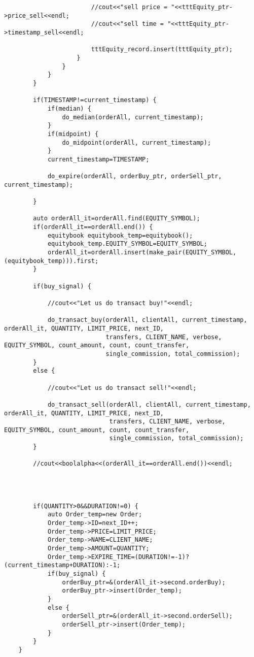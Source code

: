 \documentclass{article}
\begin{document}
\begin{spacing}{1.5}
\begin{lstlisting}
                        //cout<<"sell price = "<<tttEquity_ptr->price_sell<<endl;
                        //cout<<"sell time = "<<tttEquity_ptr->timestamp_sell<<endl;

                        tttEquity_record.insert(tttEquity_ptr);
                    }
                }
            }
        }

        if(TIMESTAMP!=current_timestamp) {
            if(median) {
                do_median(orderAll, current_timestamp);
            }
            if(midpoint) {
                do_midpoint(orderAll, current_timestamp);
            }
            current_timestamp=TIMESTAMP;

            do_expire(orderAll, orderBuy_ptr, orderSell_ptr, current_timestamp);

        }

        auto orderAll_it=orderAll.find(EQUITY_SYMBOL);
        if(orderAll_it==orderAll.end()) {
            equitybook equitybook_temp=equitybook();
            equitybook_temp.EQUITY_SYMBOL=EQUITY_SYMBOL;
            orderAll_it=orderAll.insert(make_pair(EQUITY_SYMBOL, (equitybook_temp))).first;
        }

        if(buy_signal) {

            //cout<<"Let us do transact buy!"<<endl;

            do_transact_buy(orderAll, clientAll, current_timestamp, orderAll_it, QUANTITY, LIMIT_PRICE, next_ID,
                            transfers, CLIENT_NAME, verbose, EQUITY_SYMBOL, count_amount, count, count_transfer,
                            single_commission, total_commission);
        }
        else {

            //cout<<"Let us do transact sell!"<<endl;

            do_transact_sell(orderAll, clientAll, current_timestamp, orderAll_it, QUANTITY, LIMIT_PRICE, next_ID,
                             transfers, CLIENT_NAME, verbose, EQUITY_SYMBOL, count_amount, count, count_transfer,
                             single_commission, total_commission);
        }

        //cout<<boolalpha<<(orderAll_it==orderAll.end())<<endl;




        if(QUANTITY>0&&DURATION!=0) {
            auto Order_temp=new Order;
            Order_temp->ID=next_ID++;
            Order_temp->PRICE=LIMIT_PRICE;
            Order_temp->NAME=CLIENT_NAME;
            Order_temp->AMOUNT=QUANTITY;
            Order_temp->EXPIRE_TIME=(DURATION!=-1)?(current_timestamp+DURATION):-1;
            if(buy_signal) {
                orderBuy_ptr=&(orderAll_it->second.orderBuy);
                orderBuy_ptr->insert(Order_temp);
            }
            else {
                orderSell_ptr=&(orderAll_it->second.orderSell);
                orderSell_ptr->insert(Order_temp);
            }
        }
    }


\end{lstlisting}
\end{spacing}
\end{document}
